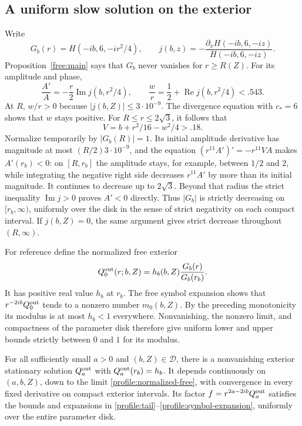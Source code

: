 \subsection{A uniform slow solution on the exterior}

Write
\[
 G_b(r)=H(-ib,6,-ir^2/4),\qquad
 j(b,z)=-\frac{\partial_xH(-ib,6,-iz)}{H(-ib,6,-iz)}.
\]
Proposition~\ref{free:main} says that $G_b$ never vanishes for
$r\ge R(Z)$.  For its amplitude and phase,
\begin{equation}\label{profile:free-j}
 \frac{A'}A=-\frac r2\operatorname{Im}j(b,r^2/4),\qquad
 \frac wr=\frac12+\operatorname{Re}j(b,r^2/4)<.543.
\end{equation}
At $R$, $w/r>0$ because $|j(b,Z)|\le3\cdot10^{-9}$.
The divergence equation with $c_*=6$ shows that $w$ stays positive.
For $R\le r\le2\sqrt3$, it follows that
\[
 V=b+r^2/16-w^2/4>.18.
\]
Normalize temporarily by $|G_b(R)|=1$.  Its initial amplitude derivative
has magnitude at most $(R/2)3\cdot10^{-9}$, and the equation
$(r^{11}A')'=-r^{11}VA$ makes $A'(r_b)<0$: on $[R,r_b]$ the amplitude
stays, for example, between $1/2$ and $2$, while integrating the negative
right side decreases $r^{11}A'$ by more than its initial magnitude.
It continues to decrease up to $2\sqrt3$.  Beyond that radius the strict
inequality $\operatorname{Im}j>0$ proves $A'<0$ directly.  Thus $|G_b|$
is strictly decreasing on $[r_b,\infty)$, uniformly over the disk in the
sense of strict negativity on each compact interval.  If $j(b,Z)=0$,
the same argument gives strict decrease throughout $(R,\infty)$.

For reference define the normalized free exterior
\begin{equation}\label{profile:normalized-free}
 Q^{\rm out}_0(r;b,Z)=h_b(b,Z)\frac{G_b(r)}{G_b(r_b)}.
\end{equation}
It has positive real value $h_b$ at $r_b$.  The free symbol expansion
shows that $r^{-2ib}Q^{\rm out}_0$ tends to a nonzero number $m_0(b,Z)$.
By the preceding monotonicity its modulus is at most $h_b<1$ everywhere.
Nonvanishing, the nonzero limit, and compactness of the parameter disk
therefore give uniform lower and upper bounds strictly between $0$ and
$1$ for its modulus.

\begin{lemma}\label{profile:exterior}
For all sufficiently small $a>0$ and $(b,Z)\in\mathcal D$, there is a
nonvanishing exterior stationary solution $Q^{\rm out}_a$ with
$Q^{\rm out}_a(r_b)=h_b$.  It depends continuously on $(a,b,Z)$, down to
the limit \eqref{profile:normalized-free}, with convergence in every
fixed derivative on compact exterior intervals.  Its factor
$f=r^{2a-2ib}Q^{\rm out}_a$ satisfies the bounds and expansions in
\eqref{profile:tail}--\eqref{profile:symbol-expansion}, uniformly over
the entire parameter disk.
\end{lemma}

